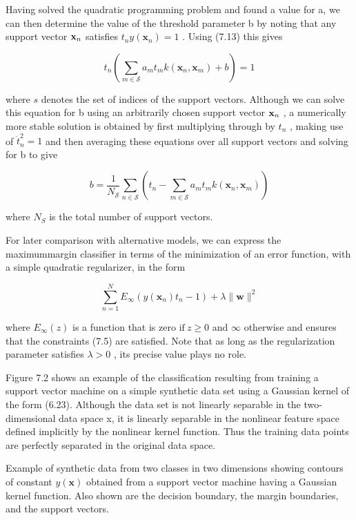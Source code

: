 \documentclass[
  10
]{article}
\begin{document}
Having solved the quadratic programming problem and found a value for a,
we can then determine the value of the threshold parameter b by noting
that any support vector \({ \bf x } _ { n }\) satisfies
\(t _ { n } y ( \mathbf x _ { n } ) = 1\) . Using (7.13) this gives

\[
t _ {n} \left(\sum_ {m \in \mathcal {S}} a _ {m} t _ {m} k (\mathbf {x} _ {n}, \mathbf {x} _ {m}) + b\right) = 1\tag{7.17}
\]

where \(s\) denotes the set of indices of the support vectors. Although
we can solve this equation for b using an arbitrarily chosen support
vector \({ \bf x } _ { n }\) , a numerically more stable solution is
obtained by first multiplying through by \(t _ { n }\) , making use of
\(\dot { t } _ { n } ^ { 2 } = 1\) and then averaging these equations
over all support vectors and solving for b to give

\[
b = \frac {1}{N _ {\mathcal {S}}} \sum_ {n \in \mathcal {S}} \left(t _ {n} - \sum_ {m \in \mathcal {S}} a _ {m} t _ {m} k (\mathbf {x} _ {n}, \mathbf {x} _ {m})\right)\tag{7.18}
\]

where \(N _ { S }\) is the total number of support vectors.

For later comparison with alternative models, we can express the
maximummargin classifier in terms of the minimization of an error
function, with a simple quadratic regularizer, in the form

\[
\sum_ {n = 1} ^ {N} E _ {\infty} (y (\mathbf {x} _ {n}) t _ {n} - 1) + \lambda \| \mathbf {w} \| ^ {2}\tag{7.19}
\]

where \(E _ { \infty } ( z )\) is a function that is zero
\(\mathrm { i f } \ z \geqslant 0\) and \(\infty\) otherwise and ensures
that the constraints (7.5) are satisfied. Note that as long as the
regularization parameter satisfies \(\lambda > 0\) , its precise value
plays no role.

Figure 7.2 shows an example of the classification resulting from
training a support vector machine on a simple synthetic data set using a
Gaussian kernel of the form (6.23). Although the data set is not
linearly separable in the two-dimensional data space x, it is linearly
separable in the nonlinear feature space defined implicitly by the
nonlinear kernel function. Thus the training data points are perfectly
separated in the original data space.

Example of synthetic data from two classes in two dimensions showing
contours of constant \(y ( \mathbf x )\) obtained from a support vector
machine having a Gaussian kernel function. Also shown are the decision
boundary, the margin boundaries, and the support vectors.
\end{document}
